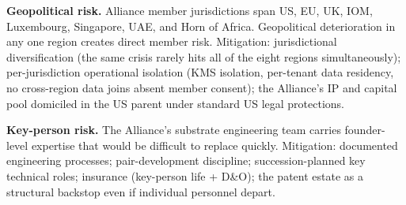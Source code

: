 \textbf{Geopolitical risk.} Alliance member jurisdictions span US, EU,
UK, IOM, Luxembourg, Singapore, UAE, and Horn of Africa. Geopolitical
deterioration in any one region creates direct member risk.
Mitigation: jurisdictional diversification (the same crisis rarely hits
all of the eight regions simultaneously); per-jurisdiction operational
isolation (KMS isolation, per-tenant data residency, no cross-region
data joins absent member consent); the Alliance's IP and capital pool
domiciled in the US parent under standard US legal protections.

\textbf{Key-person risk.} The Alliance's substrate engineering team
carries founder-level expertise that would be difficult to replace
quickly. Mitigation: documented engineering processes; pair-development
discipline; succession-planned key technical roles; insurance
(key-person life + D\&O); the patent estate as a structural backstop
even if individual personnel depart.
